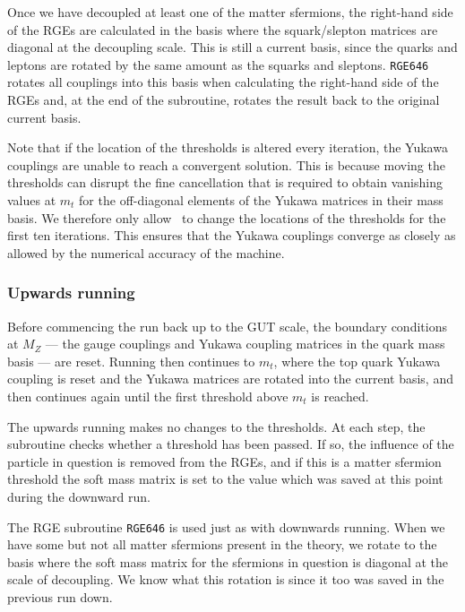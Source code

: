 Once we have decoupled at least one of the matter sfermions, the
right-hand side of the RGEs are calculated in the basis where the
squark/slepton matrices are diagonal at the decoupling scale. This is
still a current basis, since the quarks and leptons are rotated by the
same amount as the squarks and sleptons. \texttt{RGE646} rotates all
couplings into this basis when calculating the right-hand side of the
RGEs and, at the end of the subroutine, rotates the result back to the
original current basis.

Note that if the location of the thresholds is altered every iteration,
the Yukawa couplings are unable to reach a convergent solution. This is
because moving the thresholds can disrupt the fine cancellation that is
required to obtain vanishing values at $m_{t}$ for the off-diagonal
elements of the Yukawa matrices in their mass basis. We therefore only
allow \progrge~to change the locations of the thresholds for the first
ten iterations. This ensures that the Yukawa couplings converge as
closely as allowed by the numerical accuracy of the machine.

\subsubsection*{Upwards running}

Before commencing the run back up to the GUT scale, the boundary
conditions at $M_{Z}$ \mbox{---} the gauge couplings and Yukawa coupling
matrices in the quark mass basis \mbox{---} are reset. Running then
continues to $m_{t}$, where the top quark Yukawa coupling is reset and
the Yukawa matrices are rotated into the current basis, and then
continues again until the first threshold above $m_{t}$ is reached.

The upwards running makes no changes to the thresholds. At each step,
the subroutine checks whether a threshold has been passed. If so, the
influence of the particle in question is removed from the RGEs, and if
this is a matter sfermion threshold the soft mass matrix is set to the
value which was saved at this point during the downward run.

The RGE subroutine \texttt{RGE646} is used just as with downwards
running. When we have some but not all matter sfermions present in the
theory, we rotate to the basis where the soft mass matrix for the
sfermions in question is diagonal at the scale of decoupling. We know
what this rotation is since it too was saved in the previous run down.

